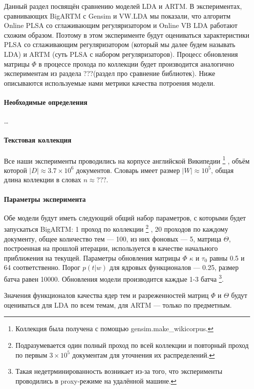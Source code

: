 \documentclass{article}
\begin{document}
Данный раздел посвящён сравнению моделей LDA и ARTM. В экспериментах, сравнивающих BigARTM с Gensim и VW.LDA мы показали, что алгоритм Online PLSA со сглаживающим регуляризатором и Online VB LDA работают схожим образом. Поэтому в этом эксперименте будут оцениваться характеристики PLSA со сглаживающим регуляризатором (который мы далее будем называть LDA) и ARTM (суть PLSA с набором регуляризаторов). Процесс обновления матрицы $\Phi$ в процессе прохода по коллекции будет производится аналогично экспериментам из раздела ???(раздел про сравнение библиотек). Ниже описываются используемые нами метрики качества потроения модели.

\paragraph{Необходимые определения} \dots%

\paragraph{Текстовая коллекция} Все наши эксперименты проводились на корпусе английской Википедии
\footnote{Коллекция была получена с помощью gensim.make\_wikicorpus.}
, объём которой $|D| \approx 3.7 \times 10^6$ документов. Словарь имеет размер $|W| \approx 10^5$, общая длина коллекции в словах $n \approx ???$.

\paragraph{Параметры эксперимента} 
Обе модели будут иметь следующий общий набор параметров, с которыми будет запускаться BigARTM: 1 проход по коллекции
\footnote{Подразумевается один полный проход по всей коллекции и повторный проход по первым $3 \times 10^5$ документам для уточнения их распределений.}
, 20 проходов по каждому документу, общее количество тем --- 100, из них фоновых --- 5, матрица $\Theta$, построенная на прошлой итерации, используется в качестве начального приближения на текущей. Параметры обновления матрицы $\Phi$ $\kappa$ и $\tau_0$ равны 0.5 и 64 соответственно. Порог $p(t|w)$ для ядровых функционалов --- 0.25, размер батча равен 10000. Обновления модели производится каждые 1-3 батча
\footnote{Такая недетрминированность возникает из-за того, что эксперименты проводились в proxy-режиме на удалённой машине.}. 

Значения функционалов качества ядер тем и разреженностей матриц $\Phi$ и $\Theta$ будут оцениваться для LDA по всем темам, для ARTM --- только по предметным.
\end{document}
